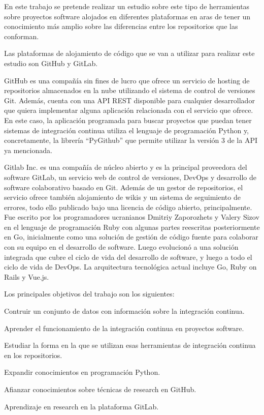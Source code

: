En este trabajo se pretende realizar un estudio sobre este tipo de herramientas sobre proyectos software alojados en diferentes plataformas en aras de tener un conocimiento más amplio sobre las diferencias entre los repositorios que las conforman.

Las plataformas de alojamiento de código que se van a utilizar para realizar este estudio son GitHub y GitLab.

GitHub es una compañía sin fines de lucro que ofrece un servicio de hosting de repositorios almacenados en la nube utilizando el sistema de control de versiones Git. 
Además, cuenta con una API REST disponible para cualquier desarrollador que quiera implementar alguna aplicación relacionada con el servicio que ofrece. 
En este caso, la aplicación programada para buscar proyectos que puedan tener sistemas de integración continua utiliza el lenguaje de programación Python y, concretamente, la librería “PyGithub” que permite utilizar la versión 3 de la API ya mencionada.

Gitlab Inc. es una compañía de núcleo abierto y es la principal proveedora del software GitLab, un servicio web de control de versiones, DevOps y desarrollo de software colaborativo basado en Git. Además de un gestor de repositorios, el servicio ofrece también alojamiento de wikis y un sistema de seguimiento de errores, todo ello publicado bajo una licencia de código abierto, principalmente.
Fue escrito por los programadores ucranianos Dmitriy Zaporozhets y Valery Sizov en el lenguaje de programación Ruby con algunas partes reescritas posteriormente en Go, inicialmente como una solución de gestión de código fuente para colaborar con su equipo en el desarrollo de software. Luego evolucionó a una solución integrada que cubre el ciclo de vida del desarrollo de software, y luego a todo el ciclo de vida de DevOps. La arquitectura tecnológica actual incluye Go, Ruby on Rails y Vue.js.

Los principales objetivos del trabajo son los siguientes:
\begin{compactitem}
    \item Contruir un conjunto de datos con información sobre la integración continua.
    \item Aprender el funcionamiento de la integración continua en proyectos software.
    \item Estudiar la forma en la que se utilizan esas herramientas de integración continua en los repositorios.
    \item Expandir conocimientos en programación Python.
    \item Afianzar conocimientos sobre técnicas de research en GitHub.
    \item Aprendizaje en research en la plataforma GitLab.
\end{compactitem}

